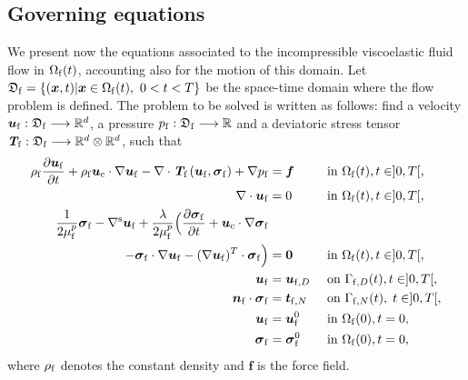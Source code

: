 \documentclass[11pt,english]{article}
\def\ufluid{\boldsymbol{u}_{\rm{f}}}
\def\ufluidD{\boldsymbol{u}_{{\rm{f}},D}}
\def\sigmafluid{\boldsymbol{\sigma}_{\rm{f}}}
\def\pfluid{p_{\rm{f}}}
\def\viscp{\mu^{p}_{\rm{f}}}
\def\alevelocity{\boldsymbol{u}_{\mathrm{c}}}
\def\Omegafluid{\Omega_{\rm{f}}}
\def\x{\boldsymbol{x}}
\begin{document}
\subsection{Governing equations}

We present now the equations associated to the incompressible viscoelastic fluid flow in $\Omega_{\rm{f}}(t)$, accounting also for the motion of this domain. 
Let $\mathfrak{D}_{\rm{f}} =\{(\x,t)\vert\x \in\Omegafluid(t),~0<t<T\}$ be the space-time domain where the flow problem is defined.
The problem to be solved is written as follows: find a velocity $\ufluid:\mathfrak{D}_{\rm{f}}\longrightarrow {\mathbb R}^d$, a pressure $\pfluid:\mathfrak{D}_{\rm{f}}\longrightarrow {\mathbb R}$ and a deviatoric stress tensor $\textit{\textbf{T}}_{\rm{f}}:\mathfrak{D}_{\rm{f}}\longrightarrow \mathbb{R}^{d}\otimes\mathbb{R}^{d}$, such that
\begin{align}
    \rho_{\rm{f}}\dfrac{\partial\ufluid}{\partial t}+\rho_{\rm{f}}\alevelocity\cdot\nabla\ufluid-\nabla\cdot\textit{\textbf{T}}_\text{f}\left(\ufluid,\sigmafluid \right)+\nabla \pfluid&=\boldsymbol{f}  && \text{ in } \Omegafluid(t),t\in]0,T[,\label{eq:EstMom}\\
    \nabla\cdot\ufluid&=0  && \text{ in }\Omegafluid(t),  t\in]0,T[,\label{eq:EstContin}\\
    \frac{1}{2\viscp}\sigmafluid-\nabla^{\rm s}\ufluid
    +\frac{\lambda}{2\viscp}\Bigl(\frac{\partial\sigmafluid}{\partial t}+\alevelocity\cdot\nabla\sigmafluid  & \nonumber \\
     -\sigmafluid\cdot\nabla\ufluid-(\nabla\ufluid)^{T}\cdot\sigmafluid\Bigr)&=\textbf{0} && \text{ in }\Omegafluid(t), t\in]0,T[,\label{eq:EstConst}\\
    \ufluid&=\ufluidD  && \text{ on }  \Gamma_{{\rm{f}},D}(t), t
    \in]0,T[, \\
    \boldsymbol{n}_{\rm{f}}\cdot\sigmafluid&=\boldsymbol{t}_{{\rm{f}},N}  && \text{ on }  \Gamma_{{\rm{f}},N}(t),  \; t \in]0,T[, \\
    \ufluid&=\ufluid^0  && \text{ in }  \Omegafluid(0), t=0, \\
    \sigmafluid&=\boldsymbol{\sigma}_{\rm{f}}^0  && \text{ in }  \Omegafluid(0), t=0,
\end{align}
where $\rho_{\rm{f}}$ denotes the constant density and $\boldsymbol{f}$ is the force field. 
\end{document}
